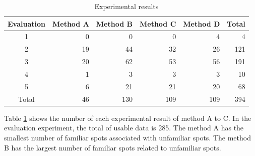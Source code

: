 \documentclass[journal]{IAENGtran}
\begin{document}
\begin{table}[t]
  \caption{Experimental results}
  \label{table:Statistics on the number of data of experiment results}
  \centering
  \begin{tabular}{c|r|r|r|r|r}
  \hline
  Evaluation & \multicolumn{1}{c|}{Method A} & \multicolumn{1}{c|}{Method B} & \multicolumn{1}{c|}{Method C} & \multicolumn{1}{c|}{Method D} & \multicolumn{1}{c}{Total} \\ \hline
  1  & 0                      & 0                      & 0                      & 4                      & 4                      \\
  2  & 19                     & 44                     & 32                     & 26                     & 121                    \\
  3  & 20                     & 62                     & 53                     & 56                     & 191                    \\
  4  & 1                      & 3                      & 3                      & 3                      & 10                     \\
  5  & 6                      & 21                     & 21                     & 20                     & 68                     \\ \hline
  Total & 46                     & 130                    & 109                    & 109                    & 394                    \\ \hline
  \end{tabular}
\end{table}

Table \ref{table:Statistics on the number of data of experiment results} shows the number of each experimental result of method A to C.
In the evaluation experiment, the total of usable data is 285.
The method A has the smallest number of familiar spots associated with unfamiliar spots.
The method B has the largest number of familiar spots related to unfamiliar spots.
\end{document}
